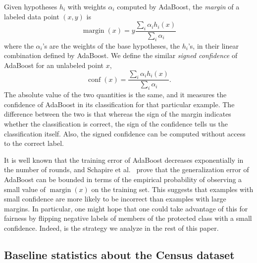 \documentclass{article}
\DeclareMathOperator{\margin}{margin}
\DeclareMathOperator{\conf}{conf}
\begin{document}

Given hypotheses $h_i$ with weights $\alpha_i$ computed by AdaBoost, the
\emph{margin} of a labeled data point $(x,y)$ is
$$ \margin(x) = y\frac{\sum_i \alpha_i h_i(x)}{\sum_i \alpha_i}$$
where the $\alpha_i$'s are the weights of the base hypotheses, the $h_i$'s,
in their linear combination defined by AdaBoost.
We define the similar \emph{signed confidence} of AdaBoost for an unlabeled point $x$,
$$ \conf(x) = \frac{\sum_i \alpha_i h_i(x)}{\sum_i \alpha_i}.$$
The absolute value of the two quantities is the same, and it measures the confidence
of AdaBoost in its classification for that particular example.
The difference between the two is that whereas the sign of the margin indicates
whether the classification is correct, the sign of the confidence
tells us the classification itself. Also, the signed confidence can be computed
without access to the correct label.

It is well known that
the training error of AdaBoost decreases exponentially in the number of rounds,
and Schapire et al.~\citep{SchapireFBL98} prove that the generalization error
of AdaBoost can be bounded in terms of the empirical probability of observing a
small value of $\margin(x)$ on the training set. This
suggests that examples with small confidence are more likely to be incorrect than
examples with large margins. In particular, one might hope that one could take
advantage of this for fairness by flipping negative labels of members of the
protected class with a small confidence. Indeed, is the strategy we analyze in the
rest of this paper.

\subsection{Baseline statistics about the Census dataset}
\end{document}
